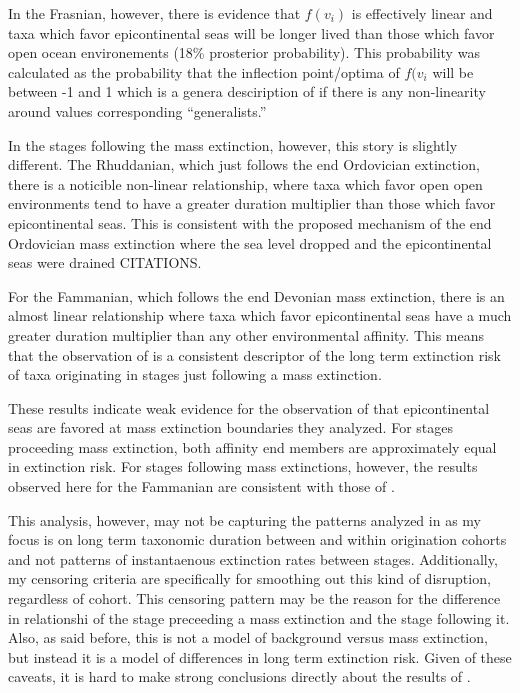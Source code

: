 \documentclass[12pt,letterpaper]{article}
\begin{document}
In the Frasnian, however, there is evidence that \(f(v_{i})\) is effectively linear and taxa which favor epicontinental seas will be longer lived than those which favor open ocean environements (18\% prosterior probability). This probability was calculated as the probability that the inflection point/optima of \(f(v_{i}\) will be between -1 and 1 which is a genera desciription of if there is any non-linearity around values corresponding ``generalists.''

In the stages following the mass extinction, however, this story is slightly different. The Rhuddanian, which just follows the end Ordovician extinction, there is a noticible non-linear relationship, where taxa which favor open open environments tend to have a greater duration multiplier than those which favor epicontinental seas. This is consistent with the proposed mechanism of the end Ordovician mass extinction where the sea level dropped and the epicontinental seas were drained CITATIONS. 

For the Fammanian, which follows the end Devonian mass extinction, there is an almost linear relationship where taxa which favor epicontinental seas have a much greater duration multiplier than any other environmental affinity. This means that the observation of \citet{Miller2009a} is a consistent descriptor of the long term extinction risk of taxa originating in stages just following a mass extinction.

These results indicate weak evidence for the observation of \citet{Miller2009a} that epicontinental seas are favored at mass extinction boundaries they analyzed. For stages proceeding mass extinction, both affinity end members are approximately equal in extinction risk. For stages following mass extinctions, however, the results observed here for the Fammanian are consistent with those of \citet{Miller2009a}.

This analysis, however, may not be capturing the patterns analyzed in \citet{Miller2009a} as my focus is on long term taxonomic duration between and within origination cohorts and not patterns of instantaenous extinction rates between stages. Additionally, my censoring criteria are specifically for smoothing out this kind of disruption, regardless of cohort. This censoring pattern may be the reason for the difference in relationshi of the stage preceeding a mass extinction and the stage following it. Also, as said before, this is not a model of background versus mass extinction, but instead it is a model of differences in long term extinction risk. Given of these caveats, it is hard to make strong conclusions directly about the results of \citet{Miller2009a}.
\end{document}
